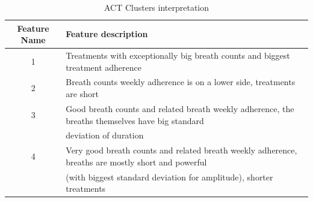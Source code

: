 \documentclass{article}
\begin{document}
\begin{table}[htb]
  \caption{ACT Clusters interpretation}
  \label{tab:act_interpret}
  \centering
  \begin{tabular}{ c|l}
    \toprule
    
  \textbf{Feature Name} & \textbf{Feature description} \\
  \midrule
    1 & Treatments with exceptionally big breath counts and biggest treatment adherence \\
  \midrule
    2 & Breath counts weekly adherence is on a lower side, treatments are short \\
  \midrule
    3 & Good breath counts and related breath weekly adherence, the breaths themselves have big standard  \\ 
    ~ &  deviation of duration \\
  \midrule
    4 & Very good breath counts and related breath weekly adherence,  breaths are mostly short and powerful \\ 
    ~ & (with biggest standard deviation for amplitude), shorter treatments  \\
  \bottomrule
    \end{tabular}
\end{table}
\end{document}
